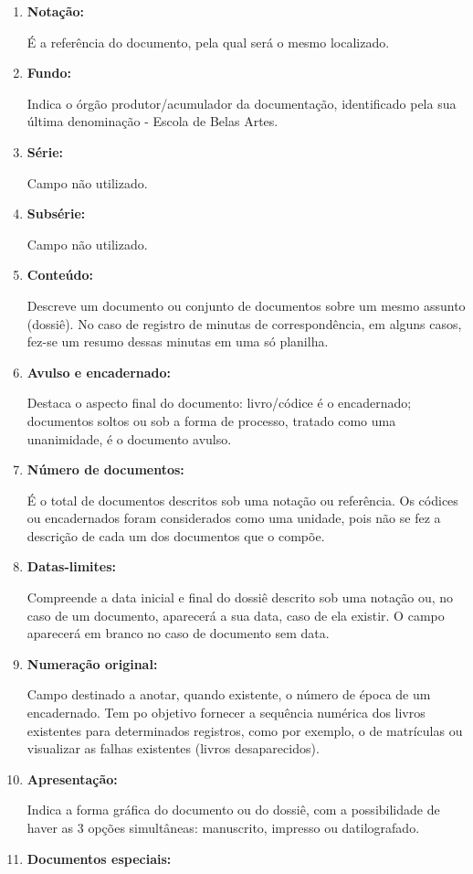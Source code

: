 \begin{enumerate}
	\item \textbf{Notação:}
	
	É a referência do documento, pela qual será o mesmo localizado.
	\item \textbf{Fundo:}
	
	Indica o órgão produtor/acumulador da documentação, identificado pela sua última denominação - Escola de Belas Artes.
	\item \textbf{Série:}
	
	Campo não utilizado.
	\item \textbf{Subsérie:}
	
	Campo não utilizado.
	\item \textbf{Conteúdo:}
	
	Descreve um documento ou conjunto de documentos sobre um mesmo assunto (dossiê). No caso de registro de minutas de correspondência, em alguns casos, fez-se um resumo dessas minutas em uma só planilha.
	\item \textbf{Avulso e encadernado:}
	
	Destaca o aspecto final do documento: livro/códice é o encadernado; documentos soltos ou sob a forma de processo, tratado como uma unanimidade, é o documento avulso.
	\item \textbf{Número de documentos:}
	
	É o total de documentos descritos sob uma notação ou referência. Os códices ou encadernados foram considerados como uma unidade, pois não se fez a descrição de cada um dos documentos que o compõe.
	\item \textbf{Datas-limites:}
	
	Compreende a data inicial e final do dossiê descrito sob uma notação ou, no caso de um documento, aparecerá a sua data, caso de ela existir. O campo aparecerá em branco no caso de documento sem data.
	\item \textbf{Numeração original:}
	
	Campo destinado a anotar, quando existente, o número de época de um encadernado. Tem po objetivo fornecer a sequência numérica dos livros existentes para determinados registros, como por exemplo, o de matrículas ou visualizar as falhas existentes (livros desaparecidos).
	\item \textbf{Apresentação:}
	
	Indica a forma gráfica do documento ou do dossiê, com a possibilidade de haver as 3 opções simultâneas: manuscrito, impresso ou datilografado.
	\item \textbf{Documentos especiais:}
	

\end{enumerate}
